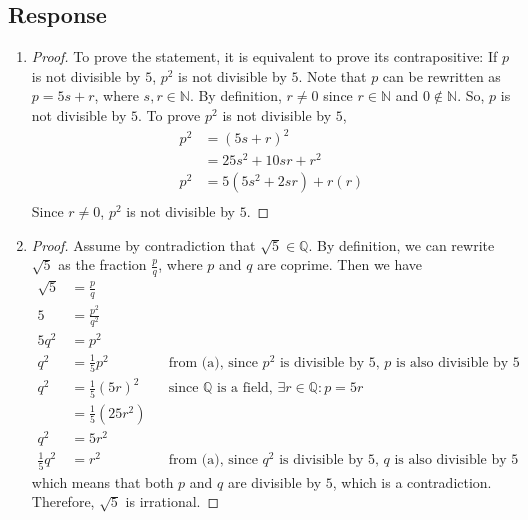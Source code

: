 \documentclass[13pt]{article}
\begin{document}
\subsection*{Response}
\begin{enumerate}[label=(\alph*)]
\item
  \begin{proof}
    To prove the statement, it is equivalent to prove its contrapositive: If $p$ is not divisible by $5$,
    $p^2$ is not divisible by $5$. Note that $p$ can be rewritten as $p = 5s + r$, where $s, r \in \mathbb{N}$.
    By definition, $r \neq 0$ since $r \in \mathbb{N}$ and $0 \not\in \mathbb{N}$. So, $p$ is not divisible by $5$.
    To prove $p^2$ is not divisible by $5$,
    \begin{align*}
      p^2 &= (5s + r)^2 \\
          &= 25s^2 + 10sr + r^2 \\
      p^2 &= 5(5s^2 + 2sr) + r(r) \\
    \end{align*}
    Since $r \neq 0$, $p^2$ is not divisible by $5$.
  \end{proof}
\item
  \begin{proof}
    Assume by contradiction that $\sqrt{5} \in \mathbb{Q}$. By definition,
    we can rewrite $\sqrt{5}$ as the fraction $\frac{p}{q}$, where $p$ and $q$ are coprime. Then we have
    \begin{align}
      \sqrt{5} &= \frac{p}{q} \\
      5 &= \frac{p^2}{q^2} \\
      5q^2 &= p^2 \\
      q^2 &= \frac{1}{5}p^2 && \text{from (a), since $p^2$ is divisible by 5, $p$ is also divisible by
                               5} \\
      q^2 &= \frac{1}{5}(5r)^2 && \text{since $\mathbb{Q}$ is a field, }
                                  \exists r \in \mathbb{Q} : p = 5r \\
               &= \frac{1}{5}(25r^2) \\
      q^2 &= 5r^2 \\
      \frac{1}{5}q^2 &= r^2 && \text{from (a), since $q^2$ is divisible by 5, $q$ is also divisible by
                               5}
    \end{align}
    which means that both $p$ and $q$ are divisible by $5$, which is a contradiction. Therefore,
    $\sqrt{5}$ is irrational.
  \end{proof}

\end{enumerate}
\end{document}
